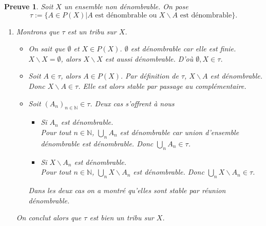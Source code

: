 \documentclass[a4paper, 12pt, french]{article}
\theoremstyle{break}
\newtheorem{preuve}{Preuve}[section]
\begin{document}
\begin{preuve}
   Soit $X$ un ensemble non dénombrable. On pose $$\tau := \{ A \in P(X) | A \mbox{ est dénombrable ou } X \backslash A \mbox{ est dénombrable}\}.$$
   \begin{enumerate}
          \item Montrons que $\tau$ est un tribu sur $X$.
          \begin{itemize}
                     \item On sait que $\emptyset$ et $X \in P(X)$. $\emptyset$ est dénombrable car elle est finie. $X \backslash X = \emptyset$, alors $X\backslash X$ est aussi dénombrable. D'où $\emptyset, X \in \tau$.
                     \item Soit $A \in \tau$, alors $A \in P(X)$. Par définition de $\tau$, $X\backslash A$ est dénombrable. Donc $X \backslash A \in \tau$. Elle est alors stable par passage au complémentaire.
                     \item Soit $(A_{n})_{n \in \mathbb{N}} \in \tau$. Deux cas s'offrent à nous 
                     \begin{itemize}
                             \item[Cas 1: ] Si $A_{n}$ est dénombrable. \\
                             Pour tout $n \in \mathbb{N}$, $\bigcup_{n} A_{n}$ est dénombrable car union d'ensemble dénombrable est dénombrable. Donc $\bigcup_{n} A_{n} \in \tau$.
                             \item[Cas 2: ] Si $X\backslash A_{n}$ est dénombrable. \\
                             Pour tout $n \in \mathbb{N}$, $\bigcup_{n} X\backslash A_{n}$ est dénombrable. Donc $\bigcup_{n} X\backslash A_{n} \in \tau$.
                     \end{itemize}
                     Dans les deux cas on a montré qu'elles sont stable par réunion dénombrable.
          \end{itemize}
          On conclut alors que $\tau$ est bien un tribu sur $X$.
   \end{enumerate}
\end{preuve}
\end{document}
